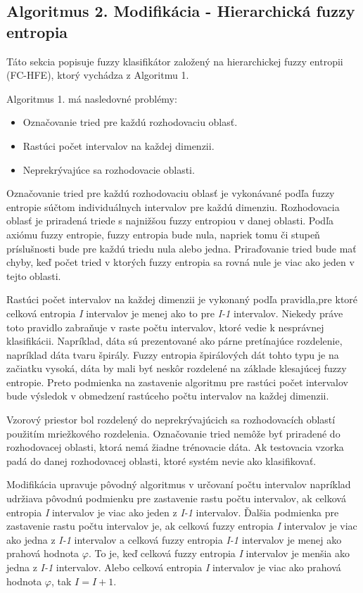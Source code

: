 \subsection{Algoritmus 2. Modifikácia - Hierarchická fuzzy entropia}
Táto sekcia popisuje fuzzy klasifikátor založený na hierarchickej fuzzy entropii (FC-HFE), ktorý vychádza z Algoritmu 1. 


Algoritmus 1. má nasledovné problémy: 
\begin{itemize}
	\item Označovanie tried pre každú rozhodovaciu oblasť.	
	\item Rastúci počet intervalov na každej dimenzii.	
	\item Neprekrývajúce sa rozhodovacie oblasti. 
\end{itemize}



Označovanie tried pre každú rozhodovaciu oblasť je vykonávané podľa fuzzy entropie súčtom individuálnych intervalov pre každú dimenziu. Rozhodovacia oblasť je priradená triede s najnižšou fuzzy entropiou v danej oblasti. Podľa axiómu fuzzy entropie, fuzzy entropia bude nula, napriek tomu či  stupeň príslušnosti bude  pre každú triedu nula alebo jedna. Priraďovanie tried bude mať chyby, keď počet tried v ktorých fuzzy entropia sa rovná nule je viac ako jeden v tejto oblasti\cite{cheng2006}.

Rastúci počet intervalov na každej dimenzii je vykonaný podľa pravidla,pre ktoré celková entropia \textit{I }intervalov je menej ako to pre \textit{I-1} intervalov. Niekedy práve toto pravidlo zabraňuje v raste počtu intervalov, ktoré vedie k nesprávnej klasifikácii. Napríklad, dáta sú prezentované ako párne pretínajúce rozdelenie, napríklad dáta tvaru špirály.  Fuzzy entropia špirálových dát tohto typu je na začiatku vysoká, dáta by mali byť neskôr rozdelené na základe klesajúcej fuzzy entropie. Preto podmienka na zastavenie algoritmu pre rastúci počet intervalov bude výsledok v obmedzení rastúceho počtu intervalov na každej dimenzii\cite{cheng2006}.

Vzorový priestor bol rozdelený do neprekrývajúcich sa rozhodovacích oblastí použitím mriežkového rozdelenia. Označovanie tried nemôže byť priradené do rozhodovacej oblasti, ktorá nemá žiadne trénovacie dáta. Ak testovacia vzorka padá do danej rozhodovacej oblasti, ktoré systém nevie ako klasifikovať\cite{cheng2006}. 


Modifikácia upravuje pôvodný algoritmus v určovaní počtu intervalov napríklad udržiava pôvodnú podmienku pre zastavenie rastu počtu intervalov, ak celková entropia \textit{I} intervalov je viac ako jeden z \textit{I-1} intervalov. Ďalšia podmienka pre zastavenie rastu počtu intervalov je, ak celková fuzzy entropia \textit{I} intervalov je viac ako jedna z \textit{I-1} intervalov a celková fuzzy entropia \textit{I-1} intervalov je menej ako prahová hodnota  $\varphi$. To je, keď celková fuzzy entropia \textit{I} intervalov je menšia ako jedna z \textit{I-1} intervalov. Alebo celková entropia \textit{\textit{I}} intervalov je viac ako prahová hodnota $\varphi$, tak $I=I+1$. 

